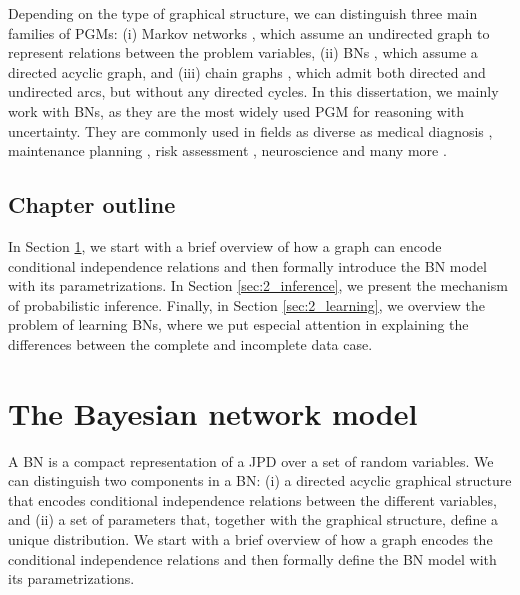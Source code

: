 Depending on the type of graphical structure, we can distinguish three main families of PGMs: (i) Markov networks \citep{kidermann1980}, which assume an undirected graph to represent relations between the problem variables, (ii) BNs \citep{pearl1988}, which assume a directed acyclic graph, and (iii) chain graphs \citep{lauritzen1989}, which admit both directed and undirected arcs, but without any directed cycles. In this dissertation, we mainly work with BNs, as they are the most widely used PGM for reasoning with uncertainty. They are commonly used in fields as diverse as medical diagnosis \citep{pourret2008}, maintenance planning \citep{jones2010}, risk assessment \citep{fenton2012}, neuroscience \citep{bielza2014} and many more \citep{koller2009}. 

\subsection*{Chapter outline}
In Section \ref{sec:2_bayesian_network_model}, we start with a brief overview of how a graph can encode conditional independence relations and then formally introduce the BN model with its parametrizations. In Section \ref{sec:2_inference}, we present the mechanism of probabilistic inference. Finally, in Section \ref{sec:2_learning}, we overview the problem of learning BNs, where we put especial attention in explaining the differences between the complete and incomplete data case.

\section{The Bayesian network model} \label{sec:2_bayesian_network_model}
A BN is a compact representation of a JPD over a set of random variables. We can distinguish two components in a BN: (i) a directed acyclic graphical structure that encodes conditional independence relations between the different variables, and (ii) a set of parameters that, together with the graphical structure, define a unique distribution. We start with a brief overview of how a graph encodes the conditional independence relations and then formally define the BN model with its parametrizations.


